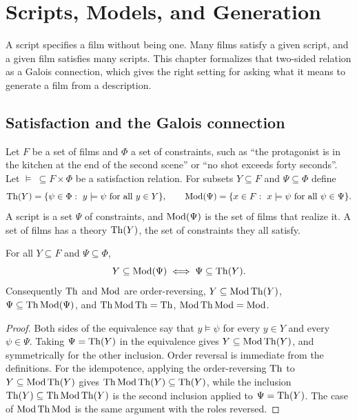 \chapter{Scripts, Models, and Generation}
\label{ch:scripts}

A script specifies a film without being one. Many films satisfy a given script, and a given film satisfies many scripts. This chapter formalizes that two-sided relation as a Galois connection, which gives the right setting for asking what it means to generate a film from a description.

\section{Satisfaction and the Galois connection}

Let $F$ be a set of films and $\Phi$ a set of constraints, such as ``the protagonist is in the kitchen at the end of the second scene'' or ``no shot exceeds forty seconds''. Let $\models\ \subseteq F\times\Phi$ be a satisfaction relation. For subsets $Y\subseteq F$ and $\Psi\subseteq\Phi$ define
\[
\Th(Y)=\{\psi\in\Phi:\ y\models\psi\ \text{for all }y\in Y\},\qquad
\Mod(\Psi)=\{x\in F:\ x\models\psi\ \text{for all }\psi\in\Psi\}.
\]
A script is a set $\Psi$ of constraints, and $\operatorname{Mod}(\Psi)$ is the set of films that realize it. A set of films has a theory $\operatorname{Th}(Y)$, the set of constraints they all satisfy.

\begin{proposition}\label{prop:galois}
For all $Y\subseteq F$ and $\Psi\subseteq\Phi$,
\[
Y\subseteq\operatorname{Mod}(\Psi)\iff\Psi\subseteq\operatorname{Th}(Y).
\]
Consequently $\operatorname{Th}$ and $\operatorname{Mod}$ are order-reversing, $Y\subseteq\operatorname{Mod}\operatorname{Th}(Y)$, $\Psi\subseteq\operatorname{Th}\operatorname{Mod}(\Psi)$, and $\operatorname{Th}\operatorname{Mod}\operatorname{Th}=\operatorname{Th}$, $\operatorname{Mod}\operatorname{Th}\operatorname{Mod}=\operatorname{Mod}$.
\end{proposition}

\begin{proof}
Both sides of the equivalence say that $y\models\psi$ for every $y\in Y$ and every $\psi\in\Psi$. Taking $\Psi=\operatorname{Th}(Y)$ in the equivalence gives $Y\subseteq\operatorname{Mod}\operatorname{Th}(Y)$, and symmetrically for the other inclusion. Order reversal is immediate from the definitions. For the idempotence, applying the order-reversing $\operatorname{Th}$ to $Y\subseteq\operatorname{Mod}\operatorname{Th}(Y)$ gives $\operatorname{Th}\operatorname{Mod}\operatorname{Th}(Y)\subseteq\operatorname{Th}(Y)$, while the inclusion $\operatorname{Th}(Y)\subseteq\operatorname{Th}\operatorname{Mod}\operatorname{Th}(Y)$ is the second inclusion applied to $\Psi=\operatorname{Th}(Y)$. The case of $\operatorname{Mod}\operatorname{Th}\operatorname{Mod}$ is the same argument with the roles reversed.
\end{proof}

